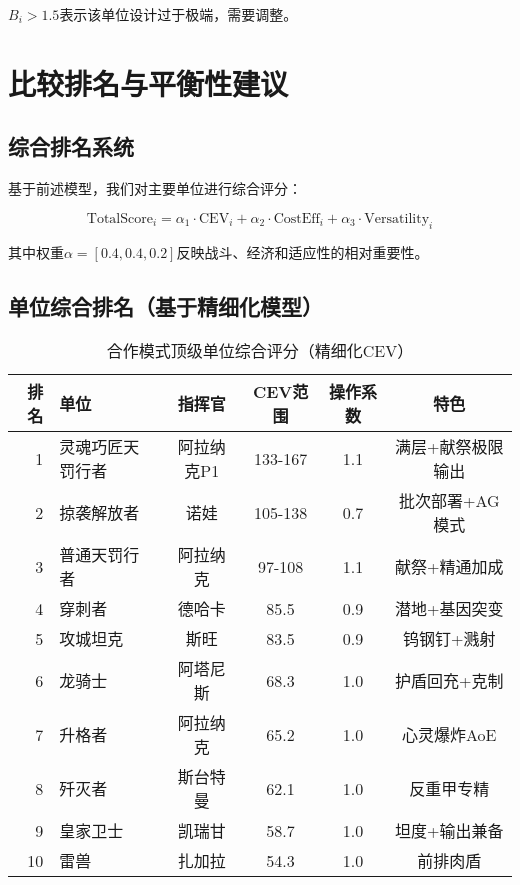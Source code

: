 \documentclass[a4paper,12pt]{article}
\begin{document}
$B_i > 1.5$表示该单位设计过于极端，需要调整。

\section{比较排名与平衡性建议}

\subsection{综合排名系统}
基于前述模型，我们对主要单位进行综合评分：

\begin{equation}
\text{TotalScore}_i = \alpha_1 \cdot \text{CEV}_i + \alpha_2 \cdot \text{CostEff}_i + \alpha_3 \cdot \text{Versatility}_i
\end{equation}

其中权重$\alpha = [0.4, 0.4, 0.2]$反映战斗、经济和适应性的相对重要性。

\subsection{单位综合排名（基于精细化模型）}
\begin{table}[h]
\centering
\caption{合作模式顶级单位综合评分（精细化CEV）}
\begin{tabular}{rlcccc}
\toprule
\textbf{排名} & \textbf{单位} & \textbf{指挥官} & \textbf{CEV范围} & \textbf{操作系数} & \textbf{特色} \\
\midrule
1 & 灵魂巧匠天罚行者 & 阿拉纳克P1 & 133-167 & 1.1 & 满层+献祭极限输出 \\
2 & 掠袭解放者 & 诺娃 & 105-138 & 0.7 & 批次部署+AG模式 \\
3 & 普通天罚行者 & 阿拉纳克 & 97-108 & 1.1 & 献祭+精通加成 \\
4 & 穿刺者 & 德哈卡 & 85.5 & 0.9 & 潜地+基因突变 \\
5 & 攻城坦克 & 斯旺 & 83.5 & 0.9 & 钨钢钉+溅射 \\
6 & 龙骑士 & 阿塔尼斯 & 68.3 & 1.0 & 护盾回充+克制 \\
7 & 升格者 & 阿拉纳克 & 65.2 & 1.0 & 心灵爆炸AoE \\
8 & 歼灭者 & 斯台特曼 & 62.1 & 1.0 & 反重甲专精 \\
9 & 皇家卫士 & 凯瑞甘 & 58.7 & 1.0 & 坦度+输出兼备 \\
10 & 雷兽 & 扎加拉 & 54.3 & 1.0 & 前排肉盾 \\
\bottomrule
\end{tabular}
\end{table}
\end{document}
